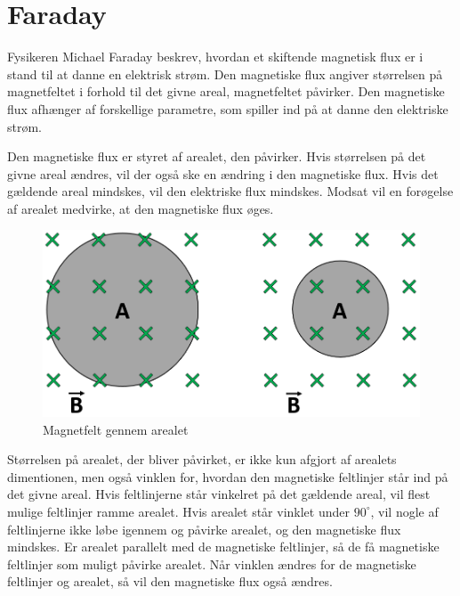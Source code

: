 \section{Faraday}
Fysikeren Michael Faraday beskrev, hvordan et skiftende magnetisk flux er i stand til at danne en elektrisk strøm. Den magnetiske flux angiver størrelsen på magnetfeltet i forhold til det givne areal, magnetfeltet påvirker. Den magnetiske flux afhænger af forskellige parametre, som spiller ind på at danne den elektriske strøm.

Den magnetiske flux er styret af arealet, den påvirker. Hvis størrelsen på det givne areal ændres, vil der også ske en ændring i den magnetiske flux. Hvis det gældende areal mindskes, vil den elektriske flux mindskes. Modsat vil en forøgelse af arealet medvirke, at den magnetiske flux øges. \cite{fysikbog}

\begin{figure}[H]
\centering
\includegraphics[scale=0.65]{Vildledning/Schematics/Areal_Bfelt}
\caption{Magnetfelt gennem arealet}
\end{figure}

Størrelsen på arealet, der bliver påvirket, er ikke kun afgjort af arealets dimentionen, men også vinklen for, hvordan den magnetiske feltlinjer står ind på det givne areal. Hvis feltlinjerne står vinkelret på det gældende areal, vil flest mulige feltlinjer ramme arealet. Hvis arealet står vinklet under $90^\circ$, vil nogle af feltlinjerne ikke løbe igennem og påvirke arealet, og den magnetiske flux mindskes. Er arealet parallelt med de magnetiske feltlinjer, så de få magnetiske feltlinjer som muligt påvirke arealet. Når vinklen ændres for de magnetiske feltlinjer og arealet, så vil den magnetiske flux også ændres. \cite{fysikbog}

